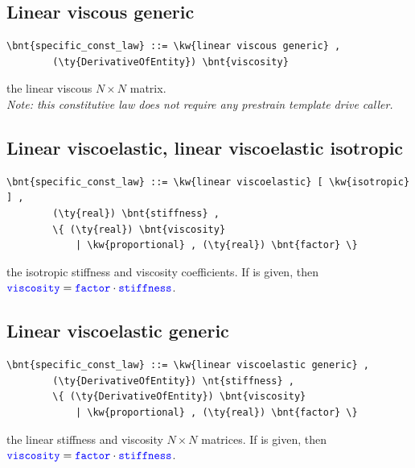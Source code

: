 \subsection{Linear viscous generic}
\begin{Verbatim}[commandchars=\\\{\}]
    \bnt{specific_const_law} ::= \kw{linear viscous generic} , 
        (\ty{DerivativeOfEntity}) \bnt{viscosity}
\end{Verbatim}
the linear viscous $N \times N $ matrix. \\
{\em 
    Note: this constitutive law does not require any prestrain template
    drive caller.
}
  
\subsection{Linear viscoelastic, linear viscoelastic isotropic}
\begin{Verbatim}[commandchars=\\\{\}]
    \bnt{specific_const_law} ::= \kw{linear viscoelastic} [ \kw{isotropic} ] ,
        (\ty{real}) \bnt{stiffness} ,
        \{ (\ty{real}) \bnt{viscosity}
            | \kw{proportional} , (\ty{real}) \bnt{factor} \}
\end{Verbatim}
the isotropic stiffness and viscosity coefficients.
If  is given, then
$\textcolor{blue}{\texttt{viscosity}} = \textcolor{blue}{\texttt{factor}} \cdot \textcolor{blue}{\texttt{stiffness}}$.
  
\subsection{Linear viscoelastic generic}
\begin{Verbatim}[commandchars=\\\{\}]
    \bnt{specific_const_law} ::= \kw{linear viscoelastic generic} ,  
        (\ty{DerivativeOfEntity}) \nt{stiffness} ,
        \{ (\ty{DerivativeOfEntity}) \bnt{viscosity} 
            | \kw{proportional} , (\ty{real}) \bnt{factor} \}
\end{Verbatim}
the linear stiffness and viscosity $N \times N$ matrices.
If  is given, then
$\textcolor{blue}{\texttt{viscosity}} = \textcolor{blue}{\texttt{factor}} \cdot \textcolor{blue}{\texttt{stiffness}}$.
  
